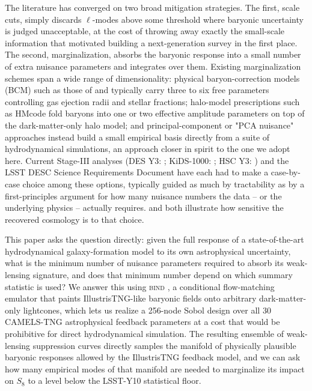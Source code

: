 \documentclass[11pt]{article}
\newcommand{\bind}{\textsc{bind}}
\begin{document}
The literature has converged on two broad mitigation strategies. The first,
scale cuts, simply discards $\ell$-modes above some threshold where baryonic
uncertainty is judged unacceptable, at the cost of throwing away exactly the
small-scale information that motivated building a next-generation survey in
the first place. The second, marginalization, absorbs the baryonic response
into a small number of extra nuisance parameters and integrates over them.
Existing marginalization schemes span a wide range of dimensionality: physical
baryon-correction models (BCM) such as those of \citet{schneiderTeyssier2015}
and \citet{schneider2019bcm} typically carry three to six free parameters
controlling gas ejection radii and stellar fractions; halo-model prescriptions
such as HMcode \citep{mead2015,mead2021} fold baryons into one or two
effective amplitude parameters on top of the dark-matter-only halo model;
and principal-component or "PCA nuisance" approaches
\citep{eifler2015,huang2019} instead build a small empirical basis directly
from a suite of hydrodynamical simulations, an approach closer in spirit to
the one we adopt here. Current Stage-III analyses (DES Y3:
\citealt{desY3Amon2022,desY3Secco2022}; KiDS-1000: \citealt{kids1000Asgari2021};
HSC Y3: \citealt{hscY3}) and the LSST DESC Science Requirements Document
\citep{lsstDescSrd2018} have each had to make a case-by-case choice among
these options, typically guided as much by tractability as by a first-principles
argument for how many nuisance numbers the data -- or the underlying physics --
actually requires. \citet{amonEfstathiou2022} and \citet{preston2023} both
illustrate how sensitive the recovered cosmology is to that choice.

This paper asks the question directly: given the full response of a
state-of-the-art hydrodynamical galaxy-formation model to its own astrophysical
uncertainty, what is the minimum number of nuisance parameters required to
absorb its weak-lensing signature, and does that minimum number depend on which
summary statistic is used? We answer this using \bind{}
\citep[Paper~I]{bindI}, a conditional flow-matching emulator that paints
IllustrisTNG-like baryonic fields onto arbitrary dark-matter-only lightcones,
which lets us realize a 256-node Sobol design over all 30 CAMELS-TNG
astrophysical feedback parameters at a cost that would be prohibitive for
direct hydrodynamical simulation. The resulting ensemble of weak-lensing
suppression curves directly samples the manifold of physically plausible
baryonic responses allowed by the IllustrisTNG feedback model, and we can ask
how many empirical modes of that manifold are needed to marginalize its impact
on $S_8$ to a level below the LSST-Y10 statistical floor.
\end{document}
